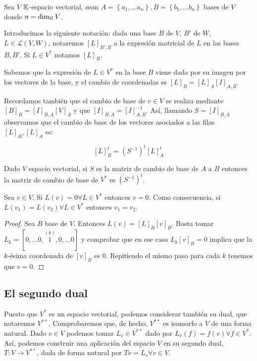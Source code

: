 Sea \(V\) \(\mathbb{K}\)-espacio vectorial, sean
\(A=\left\{a_{1}, \dots a_{n}\right\}, B=\left\{b_{1}, \dots b_{n}\right\}\)
bases de \(V\) donde \(n = \dim_{\mathbb{K}}V\).

Introducimos la siguiente notación: dada una base \(B\) de \(V\), \(B'\)
de \(W\), \(L\in\mathcal L(V, W)\), notaremos \([L]_{B', B}\) a la
expresión matricial de \(L\) en las bases \(B, B'\). Si \(L\in V^{*}\)
notamos \([L]_{B}\).

Sabemos que la expresión de \(L\in V^{*}\) en la base \(B\) viene dada
por su imagen por los vectores de la base, y el cambio de coordenadas es
\([L]_B=[L]_A[I]_{A,B}\).

Recordamos también que el cambio de base de \(v\in V\) se realiza
mediante \([B]_B=[I]_{B,A}[V]_A\) y que \([I]_{B,A}=[I]_{A,B}^{-1}\).
Así, llamando \(S=[I]_{B,A}\) observamos que el cambio de base de los
vectores asociados a las filas \([L]_B, [L]_A\) es:

\[
  [L]_{B}^t=(S^{-1})^t[L]_{A}^t
\]

\begin{prop}
Dado $V$ espacio vectorial, si $S$ es la matriz de cambio de base de $A$ a $B$ entonces la matriz de cambio de base de $V^{*}$ es $(S^{-1})^t$.
\end{prop}

\begin{lemma}
  \label{lemma:vectorcero}
  Sea $v\in V$. Si $L(v)=0\forall L\in V^{*}$ entonces $v=0$. Como consecuencia, si $L(v_1)=L(v_2)\forall L\in V^{*}$ entonces $v_1=v_2$.
  
  \begin{proof}
    Sea $B$ base de $V$. Entonces $L(v)=[L]_B[v]_B$. Basta tomar $L_k=[0, \dots 0, \overset{(k)}{1}, 0, \dots 0]$ y comprobar que en ese caso $L_k[v]_B=0$ implica que la $k$-ésima coordenada de $[v]_B$ es 0. Repitiendo el mismo paso para cada $k$ tenemos que $v=0$.
  \end{proof}
\end{lemma}

\subsection{El segundo dual}\label{el-segundo-dual}

Puesto que \(V^{*}\) es un espacio vectorial, podemos considerar también
su dual, que notaremos \(V^{**}\). Comprobaremos que, de hecho,
\(V^{**}\) es isomorfo a \(V\) de una forma natural. Dado \(v\in V\)
podemos tomar \(L_{v}\in V^{**}\) dado por
\(L_{v}(f) = f(v)\forall f\in V^{*}\). Así, podemos construir una
aplicación del espacio \(V\) en su segundo dual,
\(T:V\rightarrow V^{**}\), dada de forma natural por
\(Tv=L_v\forall v\in V\).


